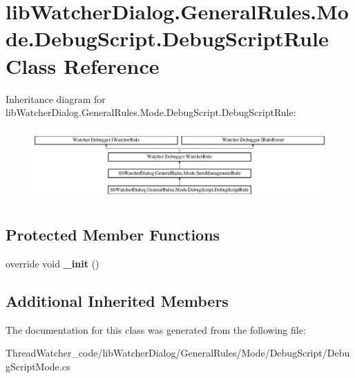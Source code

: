 \hypertarget{classlib_watcher_dialog_1_1_general_rules_1_1_mode_1_1_debug_script_1_1_debug_script_rule}{\section{lib\+Watcher\+Dialog.\+General\+Rules.\+Mode.\+Debug\+Script.\+Debug\+Script\+Rule Class Reference}
\label{classlib_watcher_dialog_1_1_general_rules_1_1_mode_1_1_debug_script_1_1_debug_script_rule}
}
Inheritance diagram for lib\+Watcher\+Dialog.\+General\+Rules.\+Mode.\+Debug\+Script.\+Debug\+Script\+Rule\+:\begin{figure}[H]
\begin{center}
\leavevmode
\includegraphics[height=2.765432cm]{classlib_watcher_dialog_1_1_general_rules_1_1_mode_1_1_debug_script_1_1_debug_script_rule}
\end{center}
\end{figure}
\subsection*{Protected Member Functions}
\begin{DoxyCompactItemize}
\item 
\hypertarget{classlib_watcher_dialog_1_1_general_rules_1_1_mode_1_1_debug_script_1_1_debug_script_rule_a559bbe509696fc9935aab5ec0dc5cb6f}{override void {\bfseries \+\_\+init} ()}\label{classlib_watcher_dialog_1_1_general_rules_1_1_mode_1_1_debug_script_1_1_debug_script_rule_a559bbe509696fc9935aab5ec0dc5cb6f}

\end{DoxyCompactItemize}
\subsection*{Additional Inherited Members}


The documentation for this class was generated from the following file\+:\begin{DoxyCompactItemize}
\item 
Thread\+Watcher\+\_\+code/lib\+Watcher\+Dialog/\+General\+Rules/\+Mode/\+Debug\+Script/Debug\+Script\+Mode.\+cs\end{DoxyCompactItemize}
